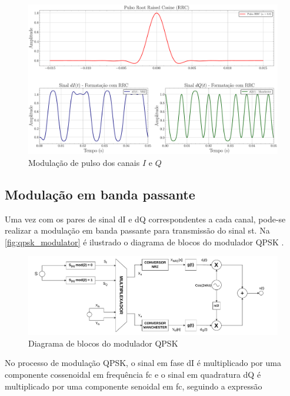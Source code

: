 \begin{figure}[H]
	\caption{Modulação de pulso dos canais $I$ e $Q$}\label{fig:pulse_modulate}
	\includegraphics[width=\linewidth]{assets/cap2/pulse_modulate.pdf}
\end{figure}



\subsection{Modulação em banda passante} 

Uma vez com os pares de sinal \gls{dI} e \gls{dQ} correspondentes a cada canal, pode-se realizar a modulação em banda passante para transmissão do sinal \gls{st}. Na \autoref{fig:qpsk_modulator} é ilustrado o diagrama de blocos do modulador \gls{QPSK} \cite{cnes_services_and_message_formats_ed2_rev2_2006}.

\begin{figure}[H]
	\centering
	\caption{Diagrama de blocos do modulador QPSK}\label{fig:qpsk_modulator}
	\includegraphics[width=\linewidth]{assets/cap2/qpsk_modulator.pdf}
\end{figure}

No processo de modulação QPSK, o sinal em fase \gls{dI} é multiplicado por uma componente cossenoidal em frequência \gls{fc} e o sinal em quadratura \gls{dQ} é multiplicado por uma componente senoidal em \gls{fc}, seguindo a expressão

